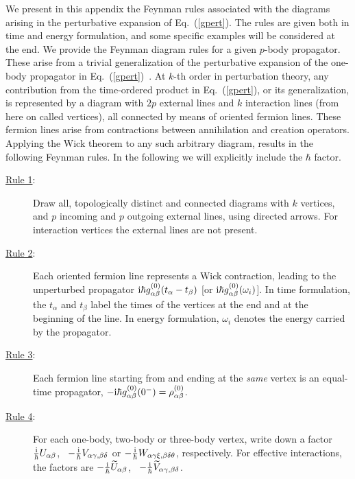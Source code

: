 We present in this appendix the Feynman rules associated with the diagrams arising
in the perturbative expansion of Eq.~(\ref{gpert}). The rules are given both in time and energy formulation, and some specific examples will be considered at the end.
We provide the Feynman diagram rules for a given $p$-body propagator. These arise from a trivial generalization of the perturbative 
expansion of the one-body propagator in Eq.~(\ref{gpert})~\cite{ch11_Carbone2013Nov}. 
At  $k$-th order in perturbation theory, any contribution from the time-ordered product in 
Eq.~(\ref{gpert}), or its generalization, is represented by a diagram with $2p$ external 
lines and $k$ interaction lines (from here on called vertices), 
all connected by means of oriented fermion lines. 
These fermion lines arise from contractions between annihilation and creation operators.
Applying the Wick theorem to any such arbitrary diagram, results in the following Feynman rules. In the following we will explicitly include the $\hbar$ factor.
\begin{description}
\item[\underline{Rule 1}:] Draw all, topologically distinct and connected diagrams with $k$ vertices, and $p$ incoming and $p$ outgoing external lines, using directed arrows. For interaction vertices the external lines are not present.
\item[\underline{Rule 2}:] Each oriented fermion line represents a Wick contraction, leading to the unperturbed propagator  
${\rm i}\hbar g_{\alpha\beta}^{(0)}(t_\alpha-t_\beta)$ [or ${\rm i}\hbar g_{\alpha\beta}^{(0)}(\omega_i)$]. 
In time formulation, the $t_\alpha$ and $t_\beta$ label the times of the vertices at the end and at the beginning of the line. 
In energy formulation, $\omega_i$ denotes the energy carried by the propagator. 
\item[\underline{Rule 3}:] Each fermion line starting from and ending at the \emph{same} vertex is an 
equal-time propagator,  $-{\rm i}\hbar g_{\alpha\beta}^{(0)}(0^-)=\rho_{\alpha\beta}^{(0)}$.
\item[\underline{Rule 4}:] For each one-body, two-body or three-body vertex, write down a factor $\frac{\rm i}{\hbar} U_{\alpha \beta}$, \, $-\frac{\rm i}{\hbar} V_{\alpha\gamma,\beta\delta}$  or  $-\frac{\rm i}{\hbar} W_{\alpha\gamma\xi,\beta\delta\theta}$, respectively. For effective interactions, the factors are $-\frac{\rm i}{\hbar} \widetilde{U}_{\alpha \beta}$, \, $-\frac{\rm i}{\hbar} \widetilde{V}_{\alpha\gamma,\beta\delta}$.
\end{description}
